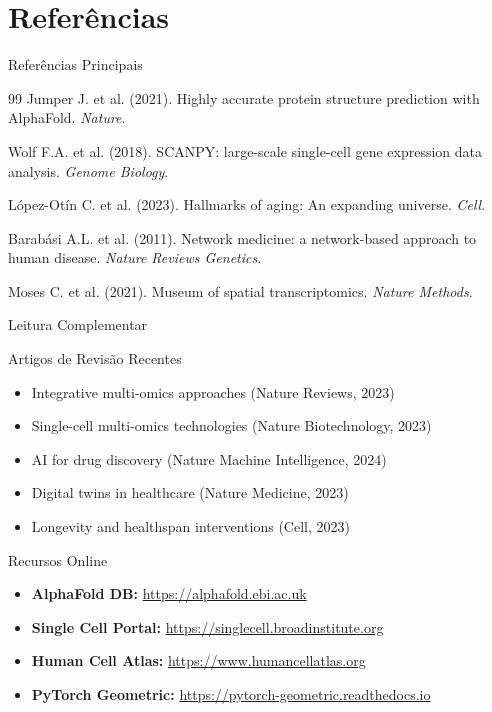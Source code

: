 \section{Referências}

\begin{frame}{Referências Principais}
\begin{thebibliography}{99}
 Jumper J. et al. (2021). Highly accurate protein structure prediction with AlphaFold. \textit{Nature}.

 Wolf F.A. et al. (2018). SCANPY: large-scale single-cell gene expression data analysis. \textit{Genome Biology}.

 López-Otín C. et al. (2023). Hallmarks of aging: An expanding universe. \textit{Cell}.

 Barabási A.L. et al. (2011). Network medicine: a network-based approach to human disease. \textit{Nature Reviews Genetics}.

 Moses C. et al. (2021). Museum of spatial transcriptomics. \textit{Nature Methods}.
\end{thebibliography}
\end{frame}

\begin{frame}{Leitura Complementar}
\begin{block}{Artigos de Revisão Recentes}
\begin{itemize}
    \item Integrative multi-omics approaches (Nature Reviews, 2023)
    \item Single-cell multi-omics technologies (Nature Biotechnology, 2023)
    \item AI for drug discovery (Nature Machine Intelligence, 2024)
    \item Digital twins in healthcare (Nature Medicine, 2023)
    \item Longevity and healthspan interventions (Cell, 2023)
\end{itemize}
\end{block}

\begin{block}{Recursos Online}
\begin{itemize}
    \item \textbf{AlphaFold DB:} \url{https://alphafold.ebi.ac.uk}
    \item \textbf{Single Cell Portal:} \url{https://singlecell.broadinstitute.org}
    \item \textbf{Human Cell Atlas:} \url{https://www.humancellatlas.org}
    \item \textbf{PyTorch Geometric:} \url{https://pytorch-geometric.readthedocs.io}
\end{itemize}
\end{block}
\end{frame}

